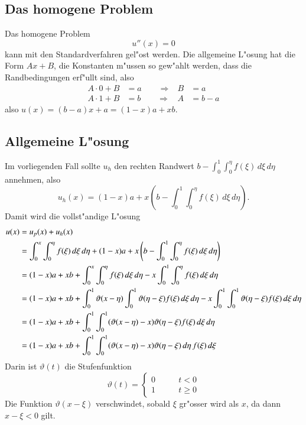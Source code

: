 \subsection{Das homogene Problem}
Das homogene Problem
\[
u''(x)=0
\]
kann mit den Standardverfahren gel"ost werden. Die allgemeine
L"osung hat die Form $Ax+B$, die Konstanten m"ussen so gew"ahlt werden,
dass die Randbedingungen erf"ullt sind, also
\begin{align*}
A\cdot 0+B&=a\qquad\Rightarrow&B&=a\\
A\cdot 1+B&=b\qquad\Rightarrow&A&=b-a
\end{align*}
also $u(x)=(b-a)x+a=(1-x)a+xb$.

\subsection{Allgemeine L"osung}
Im vorliegenden Fall sollte $u_h$ den rechten Randwert $b-\int_0^1\int_0^\eta f(\xi)\,d\xi\,d\eta$
annehmen, also
\[
u_h(x)=(1-x)a+x\left(b-\int_0^1\int_0^\eta f(\xi)\,d\xi\,d\eta\right).
\]
Damit wird die vollst"andige L"osung
\begin{align}
u(x)&=u_p(x)+u_h(x)\notag
\\
&=\int_0^x\int_0^\eta f(\xi)\,d\xi\,d\eta+(1-x)a+x\left(b-\int_0^1\int_0^\eta f(\xi)\,d\xi\,d\eta\right)\notag
\\
&=
(1-x)a+xb
+\int_0^x\int_0^\eta f(\xi)\,d\xi\,d\eta
-x\int_0^1\int_0^\eta f(\xi)\,d\xi\,d\eta\notag
\\
&=
(1-x)a+xb
+\int_0^1\vartheta(x-\eta)\int_0^1 \vartheta(\eta - \xi)f(\xi)\,d\xi\,d\eta
-x\int_0^1\int_0^1\vartheta(\eta-\xi) f(\xi)\,d\xi\,d\eta\notag
\\
&=
(1-x)a+xb
+\int_0^1\int_0^1
(\vartheta(x-\eta)-x)\vartheta(\eta -\xi)
f(\xi)\,d\xi\,d\eta
\notag
\\
&=
(1-x)a+xb+\int_0^1\int_0^1
(\vartheta(x-\eta)-x)\vartheta(\eta -\xi)
\,d\eta\,
f(\xi)\,d\xi
\label{1dimgreen}
\end{align}
Darin ist $\vartheta(t)$ die Stufenfunktion
\[
\vartheta(t)=\begin{cases}
0&\qquad t<0\\
1&\qquad t\ge 0
\end{cases}
\]
Die Funktion $\vartheta(x-\xi)$ verschwindet, sobald $\xi$ gr"osser wird
als $x$, da dann $x-\xi<0$ gilt.

